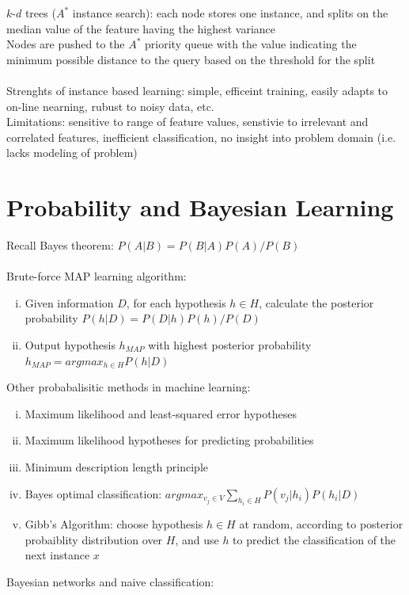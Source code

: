 \documentclass{article}
\begin{document}
		$k$-$d$ trees ($A^*$ instance search): each node stores one instance, and splits on the median value of the feature having the highest variance \\
		Nodes are pushed to the $A^*$ priority queue with the value indicating the minimum possible distance to the query based on the threshold for the split \\
		\\
		Strenghts of instance based learning: simple, efficeint training, easily adapts to on-line nearning, rubust to noisy data, etc. \\
		Limitations: sensitive to range of feature values, senstivie to irrelevant and correlated features, inefficient classification, no insight into problem domain (i.e. lacks modeling of problem)
		\clearpage

	\section{Probability and Bayesian Learning}
		Recall Bayes theorem: $P(A|B) = P(B|A)P(A)/P(B)$ \\
		\\
		Brute-force MAP learning algorithm:
		\begin{enumerate}[(i)]
			\item Given information $D$, for each hypothesis $h \in H$, calculate the posterior probability $P(h|D) = P(D|h)P(h)/P(D)$
			\item Output hypothesis $h_{MAP}$ with highest posterior probability $h_{MAP} = argmax_{h \in H} P(h|D)$
			\end{enumerate}
		Other probabalisitic methods in machine learning:
		\begin{enumerate}[(i)]
			\item Maximum likelihood and least-squared error hypotheses
			\item Maximum likelihood hypotheses for predicting probabilities
			\item Minimum description length principle
			\item Bayes optimal classification: $argmax_{v_j \in V}\sum_{h_i \in H} P(v_j|h_i)P(h_i|D)$
			\item Gibb's Algorithm: choose hypothesis $h \in H$ at random, according to posterior probaiblity distribution over $H$, and use $h$ to predict the classification of the next instance $x$ \\
			\end{enumerate}
		Bayesian networks and naive classification: \\
\end{document}
